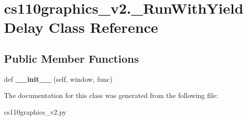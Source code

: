\hypertarget{classcs110graphics__v2_1_1__RunWithYieldDelay}{}\section{cs110graphics\+\_\+v2.\+\_\+\+Run\+With\+Yield\+Delay Class Reference}
\label{classcs110graphics__v2_1_1__RunWithYieldDelay}
\subsection*{Public Member Functions}
\begin{DoxyCompactItemize}
\item 
\mbox{\label{classcs110graphics__v2_1_1__RunWithYieldDelay_a83374cfa5436934ed7530148c119e514}} 
def {\bfseries \+\_\+\+\_\+init\+\_\+\+\_\+} (self, window, func)
\end{DoxyCompactItemize}


The documentation for this class was generated from the following file\+:\begin{DoxyCompactItemize}
\item 
cs110graphics\+\_\+v2.\+py\end{DoxyCompactItemize}
